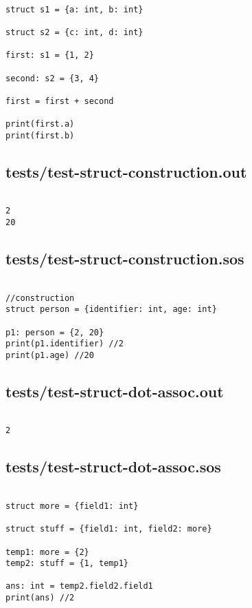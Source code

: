 \documentclass[main.tex]{subfiles}
\begin{document}
\begin{lstlisting}

struct s1 = {a: int, b: int}

struct s2 = {c: int, d: int}

first: s1 = {1, 2}

second: s2 = {3, 4}

first = first + second

print(first.a)
print(first.b)
\end{lstlisting}

\subsection{tests/test-struct-construction.out}

\begin{lstlisting}

2
20
\end{lstlisting}

\subsection{tests/test-struct-construction.sos}

\begin{lstlisting}

//construction
struct person = {identifier: int, age: int}

p1: person = {2, 20}
print(p1.identifier) //2
print(p1.age) //20
\end{lstlisting}

\subsection{tests/test-struct-dot-assoc.out}

\begin{lstlisting}

2
\end{lstlisting}

\subsection{tests/test-struct-dot-assoc.sos}

\begin{lstlisting}

struct more = {field1: int}

struct stuff = {field1: int, field2: more}

temp1: more = {2}
temp2: stuff = {1, temp1}

ans: int = temp2.field2.field1
print(ans) //2
\end{lstlisting}
\end{document}
